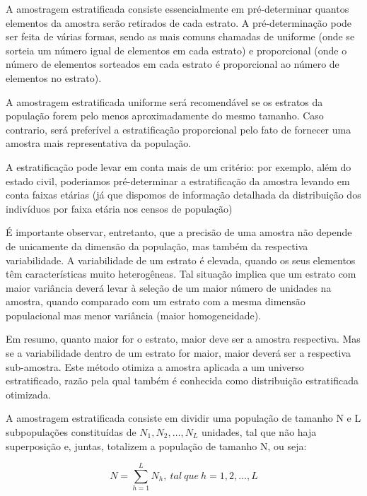 A amostragem estratificada consiste essencialmente em
pré-determinar quantos elementos da amostra serão retirados de
cada estrato. A pré-determinação pode ser feita de várias formas,
sendo as mais comuns chamadas de uniforme (onde se sorteia um
número igual de elementos em cada estrato) e proporcional (onde o
número de elementos sorteados em cada estrato é proporcional ao
número de elementos no estrato).\vskip0.3cm



A amostragem estratificada uniforme será recomendável se os
estratos da população forem pelo menos aproximadamente do mesmo
tamanho. Caso contrario, será preferível a estratificação
proporcional pelo fato de fornecer uma amostra mais representativa
da população.\vskip0.3cm


A estratificação pode levar em conta mais de um critério: por
exemplo, além do estado civil, poderiamos pré-determinar a
estratificação da amostra levando em conta faixas etárias (já que
dispomos de informação detalhada da distribuição dos indivíduos
por faixa etária nos censos de população)\vskip0.3cm

É importante observar, entretanto, que a precisão de uma amostra
não depende de unicamente da dimensão da população, mas também da
respectiva variabilidade. A variabilidade de um estrato é elevada,
quando os seus elementos têm características muito heterogêneas.
Tal situação implica que um estrato com maior variância deverá
levar à seleção de um maior número de unidades na amostra, quando
comparado com um estrato com a mesma dimensão populacional mas
menor variância (maior homogeneidade).\vskip0.3cm

Em resumo, quanto maior for o estrato, maior deve ser a amostra
respectiva. Mas se a variabilidade dentro de um estrato for maior,
maior deverá ser a respectiva sub-amostra. Este método otimiza a
amostra aplicada a um universo estratificado, razão pela qual
também é conhecida como distribuição estratificada
otimizada.\vskip0.3cm




A amostragem estratificada consiste em dividir uma população de
tamanho N e L subpopulações constituídas de
$N_{1},N_{2},\ldots,N_{L}$ unidades, tal que não haja superposição
e, juntas, totalizem a população de tamanho N, ou seja:

\begin{equation}\label{N}
    N=\sum_{h=1}^{L}N_{h}, \ tal \ que \ h=1,2,\ldots,L
\end{equation}


